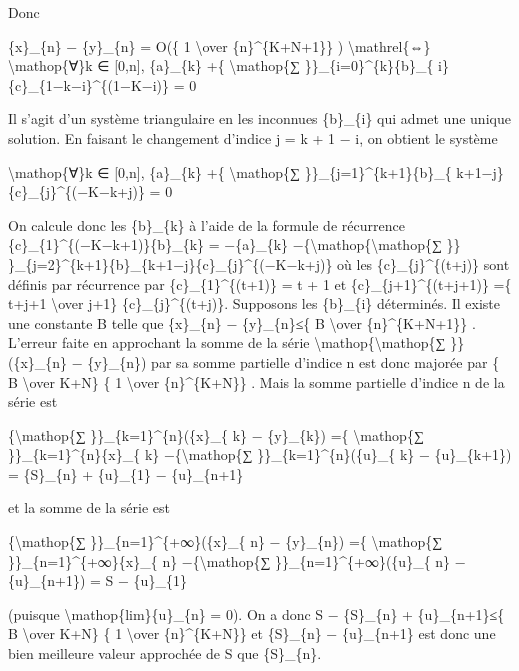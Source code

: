\documentclass[]{article}
\begin{document}
Donc

\{x\}\_\{n\} − \{y\}\_\{n\} = O(\{ 1 \textbackslash{}over
\{n\}\^{}\{K+N+1\}\} ) \textbackslash{}mathrel\{⇔\}
\textbackslash{}mathop\{∀\}k ∈ {[}0,n{]}, \{a\}\_\{k\} +\{
\textbackslash{}mathop\{∑ \}\}\_\{i=0\}\^{}\{k\}\{b\}\_\{
i\}\{c\}\_\{1−k−i\}\^{}\{(1−K−i)\} = 0

Il s'agit d'un système triangulaire en les inconnues \{b\}\_\{i\} qui
admet une unique solution. En faisant le changement d'indice j = k + 1 −
i, on obtient le système

\textbackslash{}mathop\{∀\}k ∈ {[}0,n{]}, \{a\}\_\{k\} +\{
\textbackslash{}mathop\{∑ \}\}\_\{j=1\}\^{}\{k+1\}\{b\}\_\{
k+1−j\}\{c\}\_\{j\}\^{}\{(−K−k+j)\} = 0

On calcule donc les \{b\}\_\{k\} à l'aide de la formule de récurrence
\{c\}\_\{1\}\^{}\{(−K−k+1)\}\{b\}\_\{k\} = −\{a\}\_\{k\}
−\{\textbackslash{}mathop\{\textbackslash{}mathop\{∑ \}\}
\}\_\{j=2\}\^{}\{k+1\}\{b\}\_\{k+1−j\}\{c\}\_\{j\}\^{}\{(−K−k+j)\} où
les \{c\}\_\{j\}\^{}\{(t+j)\} sont définis par récurrence par
\{c\}\_\{1\}\^{}\{(t+1)\} = t + 1 et \{c\}\_\{j+1\}\^{}\{(t+j+1)\} =\{
t+j+1 \textbackslash{}over j+1\} \{c\}\_\{j\}\^{}\{(t+j)\}. Supposons
les \{b\}\_\{i\} déterminés. Il existe une constante B telle que
\textbar{}\{x\}\_\{n\} − \{y\}\_\{n\}\textbar{}≤\{ B
\textbackslash{}over \{n\}\^{}\{K+N+1\}\} . L'erreur faite en approchant
la somme de la série \textbackslash{}mathop\{\textbackslash{}mathop\{∑
\}\} (\{x\}\_\{n\} − \{y\}\_\{n\}) par sa somme partielle d'indice n est
donc majorée par \{ B \textbackslash{}over K+N\} \{ 1
\textbackslash{}over \{n\}\^{}\{K+N\}\} . Mais la somme partielle
d'indice n de la série est

\{\textbackslash{}mathop\{∑ \}\}\_\{k=1\}\^{}\{n\}(\{x\}\_\{ k\} −
\{y\}\_\{k\}) =\{ \textbackslash{}mathop\{∑
\}\}\_\{k=1\}\^{}\{n\}\{x\}\_\{ k\} −\{\textbackslash{}mathop\{∑
\}\}\_\{k=1\}\^{}\{n\}(\{u\}\_\{ k\} − \{u\}\_\{k+1\}) = \{S\}\_\{n\} +
\{u\}\_\{1\} − \{u\}\_\{n+1\}

et la somme de la série est

\{\textbackslash{}mathop\{∑ \}\}\_\{n=1\}\^{}\{+∞\}(\{x\}\_\{ n\} −
\{y\}\_\{n\}) =\{ \textbackslash{}mathop\{∑
\}\}\_\{n=1\}\^{}\{+∞\}\{x\}\_\{ n\} −\{\textbackslash{}mathop\{∑
\}\}\_\{n=1\}\^{}\{+∞\}(\{u\}\_\{ n\} − \{u\}\_\{n+1\}) = S −
\{u\}\_\{1\}

(puisque \textbackslash{}mathop\{lim\}\{u\}\_\{n\} = 0). On a donc
\textbar{}S − \{S\}\_\{n\} + \{u\}\_\{n+1\}\textbar{}≤\{ B
\textbackslash{}over K+N\} \{ 1 \textbackslash{}over \{n\}\^{}\{K+N\}\}
et \{S\}\_\{n\} − \{u\}\_\{n+1\} est donc une bien meilleure valeur
approchée de S que \{S\}\_\{n\}.
\end{document}
